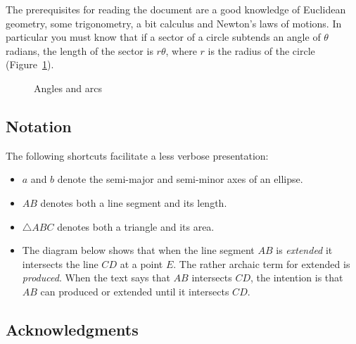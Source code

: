 The prerequisites for reading the document are a good knowledge of Euclidean geometry, some trigonometry, a bit calculus and Newton's laws of motions. In particular you must know that if a sector of a circle subtends an angle of $\theta$ radians, the length of the sector is $r\theta$, where $r$ is the radius of the circle (Figure~\ref{f.radians}).

\begin{figure}[t]
\begin{center}
\caption{Angles and arcs}\label{f.radians}
\end{center}
\end{figure}

\subsection*{Notation}

The following shortcuts facilitate a less verbose presentation:
\begin{itemize}
\item $a$ and $b$ denote the semi-major and semi-minor axes of an ellipse.
\item $AB$ denotes both a line segment and its length.
\item $\triangle ABC$ denotes both a triangle and its area.
\item The diagram below shows that when the line segment $AB$ is \emph{extended} it intersects the line $CD$ at a point $E$. The rather archaic term for extended is \emph{produced}. When the text says that $AB$ intersects $CD$, the intention is that $AB$ can produced or extended until it intersects $CD$.
\end{itemize}

\begin{center}
\end{center}

\subsection*{Acknowledgments}


